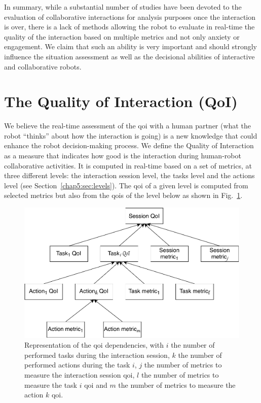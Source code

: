 \documentclass[a4paper,11pt,twoside]{StyleThese}
\begin{document}
In summary, while a substantial number of studies have been devoted to the evaluation of collaborative interactions for analysis purposes once the interaction is over, there is a lack of methods allowing the robot to evaluate in real-time the quality of the interaction based on multiple metrics and not only anxiety or engagement. We claim that such an ability is very important and should strongly influence the situation assessment as well as the decisional abilities of interactive and collaborative robots. 




\section{The Quality of Interaction (QoI)}\label{sec:eval}

We believe the real-time assessment of the \acrshort{qoi} with a human partner (\ie what the robot ``thinks'' about how the interaction is going) is a new knowledge that could enhance the robot decision-making process. We define the Quality of Interaction as a measure that indicates how good is the interaction during human-robot collaborative activities. It is computed in real-time based on a set of metrics, at three different levels: the interaction session level, the tasks level and the actions level (see Section~\ref{chap5:sec:levels}). The \acrshort{qoi} of a given level is computed from selected metrics but also from the \acrshort{qoi}s of the level below as shown in Fig.~\ref{fig:qoi_schema}.

\begin{figure}[!ht]
	\centering
	\includegraphics[width=\linewidth]{figures/chapter2/QoI_schema.pdf}
	\caption{Representation of the \acrshort{qoi} dependencies, with $i$ the number of performed tasks during the interaction session, $k$ the number of performed actions during the task $i$, $j$ the number of metrics to measure the interaction session \acrshort{qoi}, $l$ the number of metrics to measure the task $i$ \acrshort{qoi} and $m$ the number of metrics to measure the action $k$ \acrshort{qoi}.}
	\label{fig:qoi_schema}
\end{figure}
\end{document}
